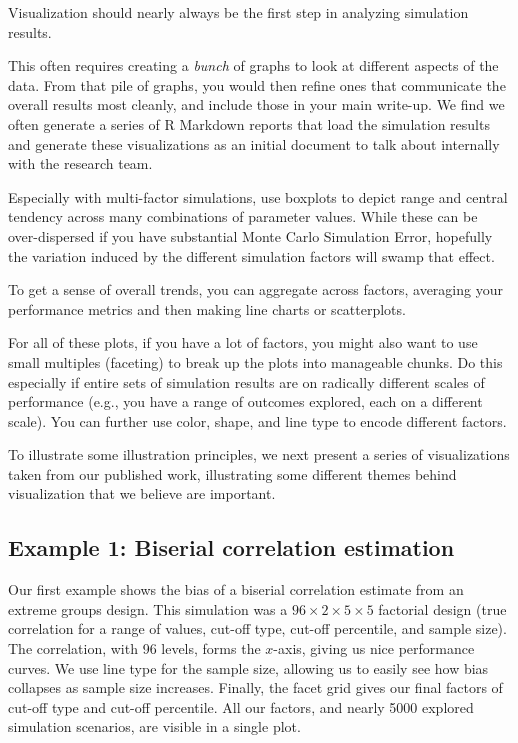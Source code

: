 \documentclass[
]{book}
\begin{document}
Visualization should nearly always be the first step in analyzing simulation results.

This often requires creating a \emph{bunch} of graphs to look at different aspects of the data.
From that pile of graphs, you would then refine ones that communicate the overall results most cleanly, and include those in your main write-up.
We find we often generate a series of R Markdown reports that load the simulation results and generate these visualizations as an initial document to talk about internally with the research team.

Especially with multi-factor simulations, use boxplots to depict range and central tendency across many combinations of parameter values.
While these can be over-dispersed if you have substantial Monte Carlo Simulation Error, hopefully the variation induced by the different simulation factors will swamp that effect.

To get a sense of overall trends, you can aggregate across factors, averaging your performance metrics and then making line charts or scatterplots.

For all of these plots, if you have a lot of factors, you might also want to use small multiples (faceting) to break up the plots into manageable chunks.
Do this especially if entire sets of simulation results are on radically different scales of performance (e.g., you have a range of outcomes explored, each on a different scale).
You can further use color, shape, and line type to encode different factors.

To illustrate some illustration principles, we next present a series of visualizations taken from our published work, illustrating some different themes behind visualization that we believe are important.

\subsection{Example 1: Biserial correlation estimation}\label{example-1-biserial-correlation-estimation}

Our first example shows the bias of a biserial correlation estimate from an extreme groups design.
This simulation was a \(96 \times 2 \times 5 \times 5\) factorial design (true correlation for a range of values, cut-off type, cut-off percentile, and sample size).
The correlation, with 96 levels, forms the \(x\)-axis, giving us nice performance curves.
We use line type for the sample size, allowing us to easily see how bias collapses as sample size increases.
Finally, the facet grid gives our final factors of cut-off type and cut-off percentile.
All our factors, and nearly 5000 explored simulation scenarios, are visible in a single plot.
\end{document}
